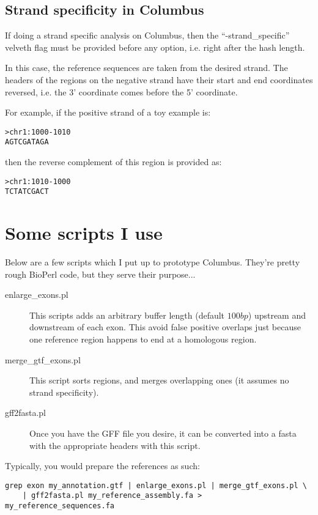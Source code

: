 \documentclass[12pt]{article}
\begin{document}
\subsection{Strand specificity in Columbus}

If doing a strand specific analysis on Columbus, then the ``-strand\_specific'' velveth flag must be provided before any option, i.e. right after the
hash length.

In this case, the reference sequences are taken from the desired strand. The headers of the regions on the negative strand have their
start and end coordinates reversed, i.e. the 3' coordinate comes before the 5' coordinate.

For example, if the positive strand of a toy example is:
\begin{verbatim}
>chr1:1000-1010
AGTCGATAGA
\end{verbatim}

then the reverse complement of this region is provided as:
\begin{verbatim}
>chr1:1010-1000
TCTATCGACT
\end{verbatim}

\section{Some scripts I use}

Below are a few scripts which I put up to prototype Columbus. They're pretty rough BioPerl code, but they serve their purpose...

\begin{description}

\item[enlarge\_exons.pl] This scripts adds an arbitrary buffer length (default $100 bp$) upstream and downstream of each exon. This avoid false positive
overlaps just because one reference region happens to end at a homologous region.

\item[merge\_gtf\_exons.pl] This script sorts regions, and merges overlapping ones (it assumes no strand specificity).

\item[gff2fasta.pl] Once you have the GFF file you desire, it can be converted into a fasta with the appropriate headers with this script.

\end{description}

Typically, you would prepare the references as such:
\begin{verbatim}
grep exon my_annotation.gtf | enlarge_exons.pl | merge_gtf_exons.pl \
	| gff2fasta.pl my_reference_assembly.fa > my_reference_sequences.fa
\end{verbatim}
\end{document}
